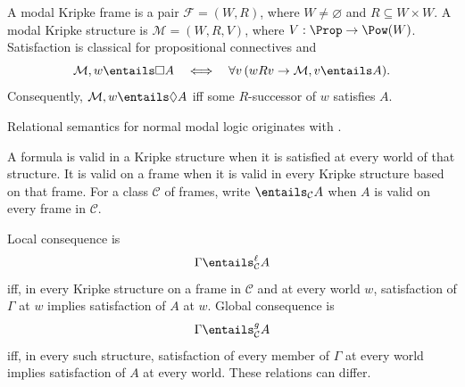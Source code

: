 \begin{definition}
A modal Kripke frame is a pair \(\mathcal F=(W,R)\), where \(W\ne\varnothing\)
and \(R\subseteq W\times W\).  A modal Kripke structure is
\(\mathcal M=(W,R,V)\), where \(V:\Prop\to\Pow(W)\).  Satisfaction is
classical for propositional connectives and
\[
  \mathcal M,w\entails\Box A
  \quad\Longleftrightarrow\quad
  \forall v\,(wRv\to\mathcal M,v\entails A).
\]
Consequently, \(\mathcal M,w\entails\Diamond A\) iff some
\(R\)-successor of \(w\) satisfies \(A\).
\end{definition}

Relational semantics for normal modal logic originates with
\cite{Kripke1963}.

\begin{definition}
A formula is valid in a Kripke structure when it is satisfied at every world
of that structure.  It is valid on a frame when it is valid in every Kripke
structure based on that frame.  For a class \(\mathcal C\) of frames, write
\(\entails_{\mathcal C}A\) when \(A\) is valid on every frame in
\(\mathcal C\).
\end{definition}

\begin{definition}
Local consequence is
\[
  \Gamma\entails^{\ell}_{\mathcal C}A
\]
iff, in every Kripke structure on a frame in \(\mathcal C\) and at every world
\(w\), satisfaction of \(\Gamma\) at \(w\) implies satisfaction of \(A\) at
\(w\).  Global consequence is
\[
  \Gamma\entails^{g}_{\mathcal C}A
\]
iff, in every such structure, satisfaction of every member of \(\Gamma\)
at every world implies satisfaction of \(A\) at every world.  These relations
can differ.
\end{definition}

